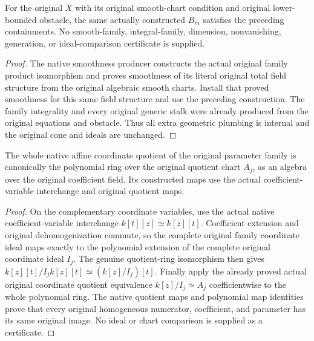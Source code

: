 \begin{corollary}
\label{cor:c0n-original-multiplier-cone-smooth-charts}
\leanok
{}
For the original $X$ with its original smooth-chart condition and original
lower-bounded obstacle, the same actually constructed $B_m$ satisfies the
preceding containments. No smooth-family, integral-family, dimension,
nonvanishing, generation, or ideal-comparison certificate is supplied.
\end{corollary}
\begin{proof}
The native smoothness producer constructs the actual original family product
isomorphism and proves smoothness of its literal original total field
structure from the original algebraic smooth charts. Install that proved
smoothness for this same field structure and use the preceding construction.
The family integrality and every original generic stalk were already produced
from the original equations and obstacle. Thus all extra geometric plumbing
is internal and the original cone and ideals are unchanged.
\end{proof}

\begin{lemma}
\label{lem:c0n-original-parameter-chart-quotient}
\leanok
The whole native affine coordinate quotient of the original parameter family
is canonically the polynomial ring over the original quotient chart $A_j$,
as an algebra over the original coefficient field. Its constructed maps use
the actual coefficient-variable interchange and original quotient maps.
\end{lemma}
\begin{proof}
On the complementary coordinate variables, use the actual native
coefficient-variable interchange $k[t][z]\simeq k[z][t]$. Coefficient extension
and original dehomogenization commute, so the complete original family
coordinate ideal maps exactly to the polynomial extension of the complete
original coordinate ideal $I_j$. The genuine quotient-ring isomorphism then
gives $k[z][t]/I_jk[z][t]\simeq(k[z]/I_j)[t]$. Finally apply the already proved
actual original coordinate quotient equivalence $k[z]/I_j\simeq A_j$
coefficientwise to the whole polynomial ring. The native quotient maps and
polynomial map identities prove that every original homogeneous numerator,
coefficient, and parameter has its same original image. No ideal or chart
comparison is supplied as a certificate.
\end{proof}

